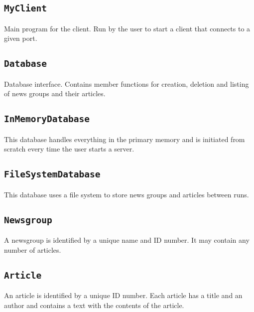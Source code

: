 \documentclass{article}
\begin{document}
\subsection{\texttt{MyClient}}
Main program for the client. Run by the user to start a client that connects to a given port. 

\subsection{\texttt{Database}}
Database interface. Contains member functions for creation, deletion and listing of news groups and their articles. 

\subsection{\texttt{InMemoryDatabase}}
This database handles everything in the primary memory and is initiated from scratch every time the user starts a server.

\subsection{\texttt{FileSystemDatabase}}
This database uses a file system to store news groups and articles between runs.


\subsection{\texttt{Newsgroup}}
A newsgroup is identified by a unique name and ID number. It may contain any number of articles.

\subsection{\texttt{Article}}
An article is identified by a unique ID number. Each article has a title and an author and contains a text with the contents of the article. %
\end{document}

